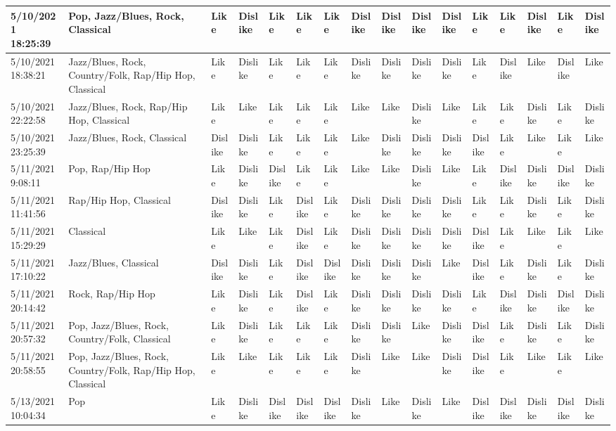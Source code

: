 \begin{table}
\begin{tabular}{|l|l|l|l|l|l|l|l|l|l|l|l|l|l|l|l|}
        5/10/2021 18:25:39 & Pop, Jazz/Blues, Rock, Classical & Like & Dislike & Like & Like & Like & Dislike & Dislike & Dislike & Dislike & Like & Like & Dislike & Like & Dislike \\ \hline
        5/10/2021 18:38:21 & Jazz/Blues, Rock, Country/Folk, Rap/Hip Hop, Classical & Like & Dislike & Like & Like & Like & Dislike & Dislike & Dislike & Dislike & Like & Dislike & Like & Dislike & Like \\ \hline
        5/10/2021 22:22:58 & Jazz/Blues, Rock, Rap/Hip Hop, Classical & Like & Like & Like & Like & Like & Like & Like & Dislike & Like & Like & Like & Dislike & Like & Dislike \\ \hline
        5/10/2021 23:25:39 & Jazz/Blues, Rock, Classical & Dislike & Dislike & Like & Like & Like & Like & Dislike & Dislike & Dislike & Dislike & Like & Like & Like & Like \\ \hline
        5/11/2021 9:08:11 & Pop, Rap/Hip Hop & Like & Dislike & Dislike & Like & Like & Like & Like & Dislike & Like & Like & Dislike & Dislike & Dislike & Dislike \\ \hline
        5/11/2021 11:41:56 & Rap/Hip Hop, Classical & Dislike & Dislike & Like & Dislike & Like & Dislike & Dislike & Dislike & Dislike & Like & Like & Dislike & Like & Dislike \\ \hline
        5/11/2021 15:29:29 & Classical & Like & Like & Like & Dislike & Like & Dislike & Dislike & Dislike & Dislike & Dislike & Like & Like & Like & Like \\ \hline
        5/11/2021 17:10:22 & Jazz/Blues, Classical & Dislike & Dislike & Like & Dislike & Dislike & Dislike & Dislike & Dislike & Like & Dislike & Like & Dislike & Like & Dislike \\ \hline
        5/11/2021 20:14:42 & Rock, Rap/Hip Hop & Like & Dislike & Like & Dislike & Like & Dislike & Dislike & Dislike & Dislike & Like & Dislike & Dislike & Dislike & Dislike \\ \hline
        5/11/2021 20:57:32 & Pop, Jazz/Blues, Rock, Country/Folk, Classical & Like & Dislike & Like & Like & Like & Dislike & Dislike & Like & Dislike & Dislike & Like & Dislike & Like & Dislike \\ \hline
        5/11/2021 20:58:55 & Pop, Jazz/Blues, Rock, Country/Folk, Rap/Hip Hop, Classical & Like & Like & Like & Like & Like & Dislike & Like & Like & Dislike & Dislike & Like & Like & Like & Like \\ \hline
        5/13/2021 10:04:34 & Pop & Like & Dislike & Dislike & Dislike & Dislike & Dislike & Like & Dislike & Like & Dislike & Dislike & Dislike & Dislike & Dislike \\ \hline

\end{tabular}
\end{table}
